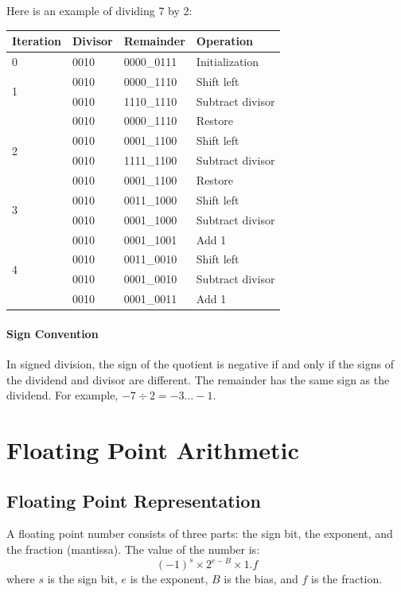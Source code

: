 \documentclass[a4paper,12pt]{article}
\begin{document}
Here is an example of dividing 7 by 2:
\begin{table}[H]
	\centering
	\begin{tabular}{llll}
		\toprule
		\textbf{Iteration} & \textbf{Divisor} & \textbf{Remainder} & \textbf{Operation} \\
		\midrule
		0 & 0010 & 0000\_0111 & Initialization \\
		\midrule
		\multirow{2}{*}{1} & 0010 & 0000\_1110 & Shift left \\
		& 0010 & 1110\_1110 & Subtract divisor \\
		& 0010 & 0000\_1110 & Restore \\
		\midrule
		\multirow{2}{*}{2} & 0010 & 0001\_1100 & Shift left \\
		& 0010 & 1111\_1100 & Subtract divisor \\
		& 0010 & 0001\_1100 & Restore \\
		\midrule
		\multirow{2}{*}{3} & 0010 & 0011\_1000 & Shift left \\
		& 0010 & 0001\_1000 & Subtract divisor \\
		& 0010 & 0001\_1001 & Add 1 \\
		\midrule
		\multirow{2}{*}{4} & 0010 & 0011\_0010 & Shift left \\
		& 0010 & 0001\_0010 & Subtract divisor \\
		& 0010 & 0001\_0011 & Add 1 \\
		\bottomrule
	\end{tabular}
\end{table}

\paragraph{Sign Convention} In signed division, the sign of the quotient is negative if and only if the signs of the dividend and divisor are different. The remainder has the same sign as the dividend. For example, $-7 \div 2 = -3 \dots -1$.

\section{Floating Point Arithmetic}

\subsection{Floating Point Representation}

A floating point number consists of three parts: the sign bit, the exponent, and the fraction (mantissa). The value of the number is:
\begin{equation*}
	(-1)^s \times 2^{e - B} \times 1.f
\end{equation*}
where $s$ is the sign bit, $e$ is the exponent, $B$ is the bias, and $f$ is the fraction.
\end{document}
